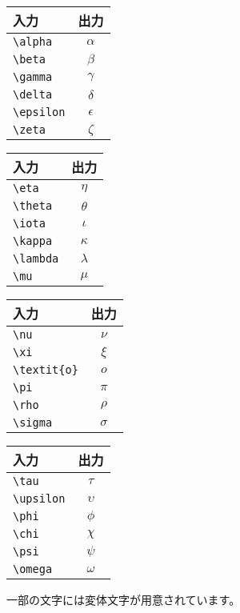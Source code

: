 \documentclass[class=jreport, crop=false, preview=false, dvipdfmx, fleqn]{standalone}
\begin{document}
\begin{tabular}{lc}
入力 & 出力 \\ \hline
\verb|\alpha| & $\alpha$ \\
\verb|\beta| & $\beta$ \\
\verb|\gamma| & $\gamma$ \\
\verb|\delta| & $\delta$ \\
\verb|\epsilon| & $\epsilon$ \\
\verb|\zeta| & $\zeta$ \\
\end{tabular}
\begin{tabular}{lc}
入力 & 出力 \\ \hline
\verb|\eta| & $\eta$ \\
\verb|\theta| & $\theta$ \\
\verb|\iota| & $\iota$ \\
\verb|\kappa| & $\kappa$ \\
\verb|\lambda| & $\lambda$ \\
\verb|\mu| & $\mu$ \\
\end{tabular}
\begin{tabular}{lc}
入力 & 出力 \\ \hline
\verb|\nu| & $\nu$ \\
\verb|\xi| & $\xi$ \\
\verb|\textit{o}| & $\textit{o}$ \\
\verb|\pi| & $\pi$ \\
\verb|\rho| & $\rho$ \\
\verb|\sigma| & $\sigma$ \\
\end{tabular}
\begin{tabular}{lc}
入力 & 出力 \\ \hline
\verb|\tau| & $\tau$ \\
\verb|\upsilon| & $\upsilon$ \\
\verb|\phi| & $\phi$ \\
\verb|\chi| & $\chi$ \\
\verb|\psi| & $\psi$ \\
\verb|\omega| & $\omega$ \\
\end{tabular}

一部の文字には変体文字が用意されています。
\end{document}
